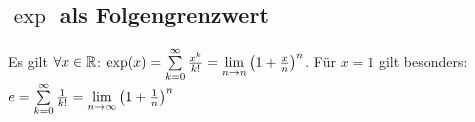 \subsection*{\texorpdfstring{$\exp$}{Exponentialfunktion} als Folgengrenzwert}
Es gilt $\forall x \in \mathbb R$: $\exp(x) = \sum\limits_{k = 0}^\infty \frac{x^k}{k!} = \lim\limits_{n \rightarrow n} \left(1 + \frac{x}{n}\right)^n$. Für $x = 1$ gilt besonders: $e = \sum\limits_{k = 0}^\infty \frac{1}{k!} = \lim\limits_{n \rightarrow \infty}\left(1 + \frac{1}{n}\right)^n$

